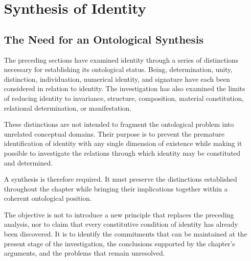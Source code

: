 %
%
%
%

\section{Synthesis of Identity}
\label{sec:synthesis-of-identity}

\subsection{The Need for an Ontological Synthesis}

The preceding sections have examined identity through a
series of distinctions necessary for establishing its
ontological status. Being, determination, unity, distinction,
individuation, numerical identity, and signature have each
been considered in relation to identity. The investigation
has also examined the limits of reducing identity to
invariance, structure, composition, material constitution,
relational determination, or manifestation.

These distinctions are not intended to fragment the
ontological problem into unrelated conceptual domains.
Their purpose is to prevent the premature identification
of identity with any single dimension of existence while
making it possible to investigate the relations through
which identity may be constituted and determined.

A synthesis is therefore required. It must preserve the
distinctions established throughout the chapter while
bringing their implications together within a coherent
ontological position.

The objective is not to introduce a new principle that
replaces the preceding analysis, nor to claim that every
constitutive condition of identity has already been
discovered. It is to identify the commitments that can
be maintained at the present stage of the investigation,
the conclusions supported by the chapter's arguments,
and the problems that remain unresolved.

